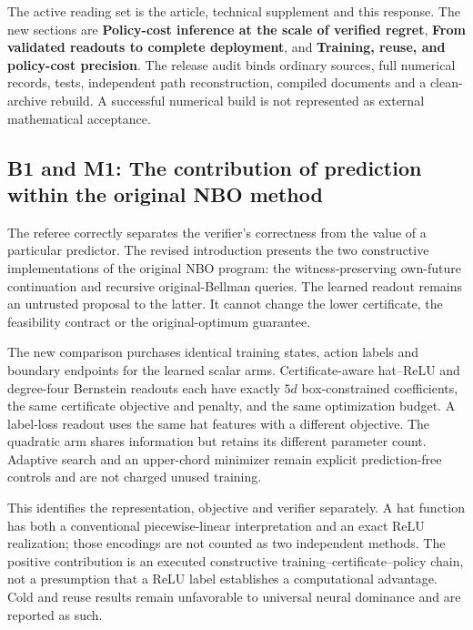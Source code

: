 The active reading set is the article, technical supplement and this
response. The new sections are \textbf{Policy-cost inference at the
scale of verified regret}, \textbf{From validated readouts to complete
deployment}, and \textbf{Training, reuse, and policy-cost precision}.
The release audit binds ordinary sources, full numerical records, tests,
independent path reconstruction, compiled documents and a clean-archive
rebuild. A successful numerical build is not represented as external
mathematical acceptance.

\hypertarget{b1-and-m1-the-contribution-of-prediction-within-the-original-nbo-method}{%
\subsection{B1 and M1: The contribution of prediction within the
original NBO
method}\label{b1-and-m1-the-contribution-of-prediction-within-the-original-nbo-method}}

The referee correctly separates the verifier's correctness from the
value of a particular predictor. The revised introduction presents the
two constructive implementations of the original NBO program: the
witness-preserving own-future continuation and recursive
original-Bellman queries. The learned readout remains an untrusted
proposal to the latter. It cannot change the lower certificate, the
feasibility contract or the original-optimum guarantee.

The new comparison purchases identical training states, action labels
and boundary endpoints for the learned scalar arms. Certificate-aware
hat--ReLU and degree-four Bernstein readouts each have exactly \(5d\)
box-constrained coefficients, the same certificate objective and
penalty, and the same optimization budget. A label-loss readout uses the
same hat features with a different objective. The quadratic arm shares
information but retains its different parameter count. Adaptive search
and an upper-chord minimizer remain explicit prediction-free controls
and are not charged unused training.

This identifies the representation, objective and verifier separately. A
hat function has both a conventional piecewise-linear interpretation and
an exact ReLU realization; those encodings are not counted as two
independent methods. The positive contribution is an executed
constructive training--certificate--policy chain, not a presumption that
a ReLU label establishes a computational advantage. Cold and reuse
results remain unfavorable to universal neural dominance and are
reported as such.

